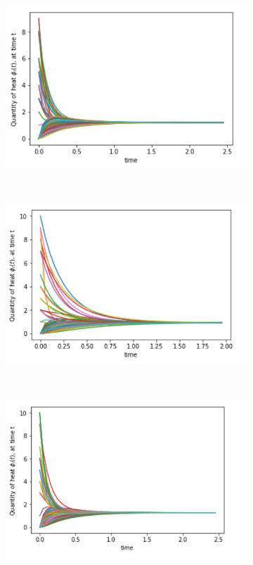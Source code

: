 \documentclass[10pt,a4paper]{article}
\begin{document}
     \begin{figure}[H]
     	\centering
     	\begin{subfigure}[b]{0.45\textwidth}
     		\includegraphics[width= \textwidth]{images/BA-degreesource.png}
     		\caption{}
     		\label{}
     	\end{subfigure}~
     	\begin{subfigure}[b]{0.45\textwidth}
     		\includegraphics[width= \textwidth]{images/BA-randomsource.png}
     		\caption{}
     		\label{}
     	\end{subfigure}\\
     	\begin{subfigure}[b]{0.45\textwidth}
     		\includegraphics[width= \textwidth]{images/ER-degreesource.png}

\end{subfigure}
\end{figure}
\end{document}
